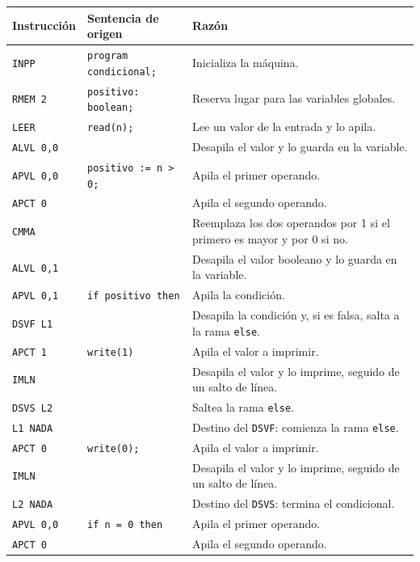 \documentclass[12pt]{article}
\begin{document}
\begin{longtable}{|p{3.2cm}|p{5cm}|p{7cm}|}
\hline
\textbf{Instrucción} & \textbf{Sentencia de origen} & \textbf{Razón} \\
\hline
\endhead
\texttt{INPP} & \texttt{program condicional;} & Inicializa la máquina. \\
\hline
\texttt{RMEM 2} & \texttt{positivo: boolean;} & Reserva lugar para las variables globales. \\
\hline
\texttt{LEER} & \texttt{read(n);} & Lee un valor de la entrada y lo apila. \\
\hline
\texttt{ALVL 0,0} & \texttt{} & Desapila el valor y lo guarda en la variable. \\
\hline
\texttt{APVL 0,0} & \texttt{positivo := n > 0;} & Apila el primer operando. \\
\hline
\texttt{APCT 0} & \texttt{} & Apila el segundo operando. \\
\hline
\texttt{CMMA} & \texttt{} & Reemplaza los dos operandos por 1 si el primero es mayor y por 0 si no. \\
\hline
\texttt{ALVL 0,1} & \texttt{} & Desapila el valor booleano y lo guarda en la variable. \\
\hline
\texttt{APVL 0,1} & \texttt{if positivo then} & Apila la condición. \\
\hline
\texttt{DSVF L1} & \texttt{} & Desapila la condición y, si es falsa, salta a la rama \texttt{else}. \\
\hline
\texttt{APCT 1} & \texttt{write(1)} & Apila el valor a imprimir. \\
\hline
\texttt{IMLN} & \texttt{} & Desapila el valor y lo imprime, seguido de un salto de línea. \\
\hline
\texttt{DSVS L2} & \texttt{} & Saltea la rama \texttt{else}. \\
\hline
\texttt{L1 NADA} & \texttt{} & Destino del \texttt{DSVF}: comienza la rama \texttt{else}. \\
\hline
\texttt{APCT 0} & \texttt{write(0);} & Apila el valor a imprimir. \\
\hline
\texttt{IMLN} & \texttt{} & Desapila el valor y lo imprime, seguido de un salto de línea. \\
\hline
\texttt{L2 NADA} & \texttt{} & Destino del \texttt{DSVS}: termina el condicional. \\
\hline
\texttt{APVL 0,0} & \texttt{if n = 0 then} & Apila el primer operando. \\
\hline
\texttt{APCT 0} & \texttt{} & Apila el segundo operando. \\

\end{longtable}
\end{document}
